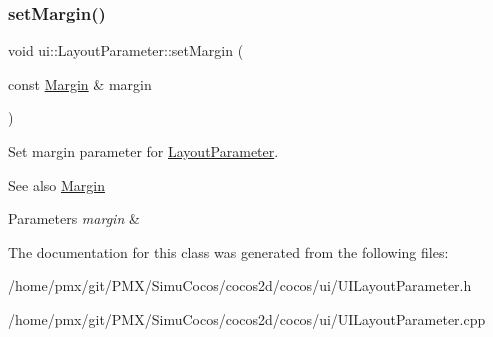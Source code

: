 \subsubsection{\texorpdfstring{set\+Margin()}{setMargin()}\hspace{0.1cm}{\footnotesize\ttfamily [2/2]}}
{\footnotesize\ttfamily void ui\+::\+Layout\+Parameter\+::set\+Margin (\begin{DoxyParamCaption}\item[{const \hyperlink{classui_1_1Margin}{Margin} \&}]{margin }\end{DoxyParamCaption})}

Set margin parameter for \hyperlink{classui_1_1LayoutParameter}{Layout\+Parameter}.

\begin{DoxySeeAlso}{See also}
\hyperlink{classui_1_1Margin}{Margin} 
\end{DoxySeeAlso}

\begin{DoxyParams}{Parameters}
{\em margin} & \\
\hline
\end{DoxyParams}


The documentation for this class was generated from the following files\+:\begin{DoxyCompactItemize}
\item 
/home/pmx/git/\+P\+M\+X/\+Simu\+Cocos/cocos2d/cocos/ui/U\+I\+Layout\+Parameter.\+h\item 
/home/pmx/git/\+P\+M\+X/\+Simu\+Cocos/cocos2d/cocos/ui/U\+I\+Layout\+Parameter.\+cpp\end{DoxyCompactItemize}
